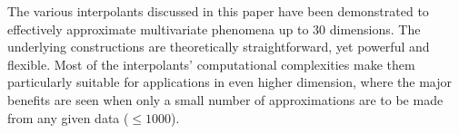 \documentclass[smallextended,final]{svjour3}       %
\begin{document}
The various interpolants discussed in this paper have been
demonstrated to effectively approximate multivariate phenomena up to
$30$ dimensions. The underlying constructions are theoretically
straightforward, yet powerful and flexible. Most of the interpolants'
computational complexities make them particularly suitable for
applications in even higher dimension, where the major benefits are
seen when only a small number of approximations are to be made from
any given data ($\leq 1000$).




\end{document}
